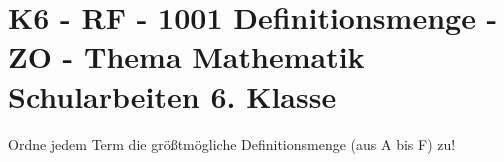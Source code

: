 \section{K6 - RF - 1001 Definitionsmenge - ZO - Thema Mathematik Schularbeiten 6. Klasse}

\begin{beispiel}[K6 - RF]{1} %
			Ordne jedem Term die größtmögliche Definitionsmenge (aus A bis F) zu!
			
			\zuordnen{
							R1={$\ln(x-7)$},				%
							R2={$\sqrt{x-7}$},				%
							R3={$\cos(x-7)\cdot x^{-2}$},				%
							R4={$(x-7)\cdot e^{-x}$},				%
							A={$D_A=\left[7,\infty\right)$}, 				%
							B={$D_B=\left(-\infty,7\right)$}, 				%
							C={$D_C=\left(-7,\infty\right)$}, 				%
							D={$D_D=\mathbb{R}\backslash\left\{0\right\}$}, 				%
							E={$D_E=\mathbb{R}$}, 				%
							F={$D_F=\left(7,\infty\right)$}, 				%
							A1={F},				%
							A2={A},				%
							A3={D},				%
							A4={E},				%
							}
							\end{beispiel}